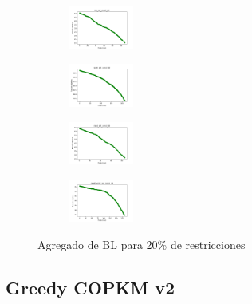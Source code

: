 \begin{figure}[H]
\begin{subfigure}
        \centering
        \includegraphics[width=0.234\textwidth]{img/bl/iris_set_const_20_3773969821_cost.png}
    \end{subfigure}
    \hfill
    \begin{subfigure}
        \centering
        \includegraphics[width=0.234\textwidth]{img/bl/ecoli_set_const_20_3773969821_cost.png}
    \end{subfigure}
    \hfill
    \begin{subfigure}
        \centering
        \includegraphics[width=0.234\textwidth]{img/bl/rand_set_const_20_3773969821_cost.png}
    \end{subfigure}
    \hfill
    \begin{subfigure}
        \centering
        \includegraphics[width=0.234\textwidth]{img/bl/newthyroid_set_const_20_3773969821_cost.png}
    \end{subfigure}
    \caption{Agregado de BL para 20\% de restricciones}
\end{figure}

\vspace*{\fill}
\newpage

\subsection{Greedy COPKM v2}

\vspace*{\fill}

